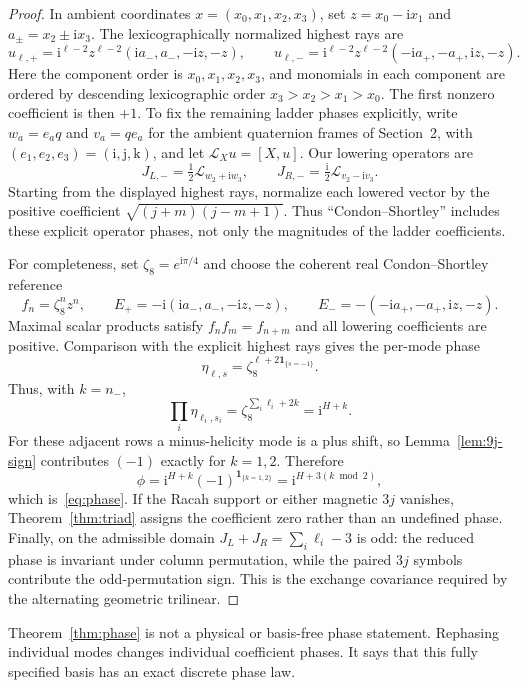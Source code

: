 \documentclass[12pt]{article}
\theoremstyle{definition}
\theoremstyle{remark}
\newcommand{\ii}{\mathrm i}
\begin{document}
\begin{proof}
In ambient coordinates $x=(x_0,x_1,x_2,x_3)$, set
$z=x_0-\ii x_1$ and $a_\pm=x_2\pm\ii x_3$.  The lexicographically normalized
highest rays are
\[
 u_{\ell,+}=\ii^{\ell-2}z^{\ell-2}
    (\ii a_-,a_-,-\ii z,-z),\qquad
 u_{\ell,-}=\ii^{\ell-2}z^{\ell-2}
    (-\ii a_+,-a_+,\ii z,-z).
\]
Here the component order is $x_0,x_1,x_2,x_3$, and monomials in each
component are ordered by descending lexicographic order
$x_3>x_2>x_1>x_0$.  The first nonzero coefficient is then $+1$.
To fix the remaining ladder phases explicitly, write $w_a=e_aq$ and
$v_a=qe_a$ for the ambient quaternion frames of Section~2, with
$(e_1,e_2,e_3)=(\ii,\mathrm j,\mathrm k)$, and let
$\mathcal L_Xu=[X,u]$.  Our lowering operators are
\[
 J_{L,-}=\tfrac12\mathcal L_{w_2+\ii w_3},\qquad
 J_{R,-}=\tfrac{\ii}{2}\mathcal L_{v_2-\ii v_3}.
\]
Starting from the displayed highest rays, normalize each lowered vector by
the positive coefficient $\sqrt{(j+m)(j-m+1)}$.  Thus
``Condon--Shortley'' includes these explicit operator phases, not only the
magnitudes of the ladder coefficients.

For completeness, set $\zeta_8=e^{\ii\pi/4}$ and choose the coherent real
Condon--Shortley reference
\[
 f_n=\zeta_8^n z^n,\qquad
 E_+=-\ii(\ii a_-,a_-,-\ii z,-z),\qquad
 E_-=-(-\ii a_+,-a_+,\ii z,-z).
\]
Maximal scalar products satisfy $f_nf_m=f_{n+m}$ and all lowering
coefficients are positive.  Comparison with the explicit highest rays gives
the per-mode phase
\[
 \eta_{\ell,s}=\zeta_8^{\ell+2\mathbf1_{\{s=-1\}}}.
\]
Thus, with $k=n_-$,
\[
 \prod_i\eta_{\ell_i,s_i}
 =\zeta_8^{\sum_i\ell_i+2k}=\ii^{H+k}.
\]
For these adjacent rows a minus-helicity mode is a plus shift, so
Lemma~\ref{lem:9j-sign} contributes $(-1)$ exactly for $k=1,2$.  Therefore
\[
 \phi=\ii^{H+k}(-1)^{\mathbf1_{\{k=1,2\}}}
      =\ii^{H+3(k\bmod2)},
\]
which is~\eqref{eq:phase}.  If the Racah support or either magnetic $3j$
vanishes, Theorem~\ref{thm:triad} assigns the coefficient zero rather than an
undefined phase.  Finally, on the admissible domain
$J_L+J_R=\sum_i\ell_i-3$ is odd: the reduced phase is invariant under column
permutation, while the paired $3j$ symbols contribute the odd-permutation
sign.  This is the exchange covariance required by the alternating geometric
trilinear.
\end{proof}

Theorem~\ref{thm:phase} is not a physical or basis-free phase statement.
Rephasing individual modes changes individual coefficient phases.  It says
that this fully specified basis has an exact discrete phase law.
\end{document}
